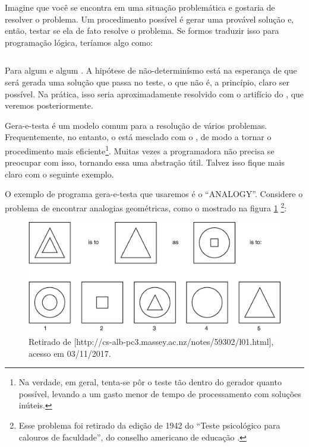 \documentclass{article}
\begin{document}
  Imagine que você se encontra em uma situação problemática e gostaria de resolver o problema. Um procedimento possível é gerar uma provável solução e, então, testar se ela de fato resolve o problema. Se formos traduzir isso para programação lógica, teríamos algo como:

%
\inputminted{prolog}{../Exemplos/Cap1/prog2_encontra.pl}

Para algum  e algum . A hipótese de não-determinísmo está na esperança de que será gerada uma solução que passa no teste, o que não é, a princípio, claro ser possível. Na prática, isso seria aproximadamente resolvido com o artifício do , que veremos posteriormente.

Gera-e-testa é um modelo comum para a resolução de vários problemas. Frequentemente, no entanto, o  está mesclado com o , de modo a tornar o procedimento mais eficiente\footnote{Na verdade, em geral, tenta-se pôr o teste tão dentro do gerador quanto possível, levando a um gasto menor de tempo de processamento com soluções inúteis.}. Muitas vezes a programadora não precisa se preocupar com isso, tornando essa uma abstração útil. Talvez isso fique mais claro com o seguinte exemplo.

O exemplo de programa gera-e-testa que usaremos é o ``ANALOGY''. Considere o problema de encontrar analogias geométricas, como o mostrado na figura \ref{fig:psi} \footnote{Esse problema foi retirado da edição de 1942 do ``Teste psicológico para calouros de faculdade'', do conselho americano de educação \cite{evans}.}:

\begin{figure}[h]
  \caption{Retirado de [http://cs-alb-pc3.massey.ac.nz/notes/59302/l01.html], acesso em 03/11/2017.}\label{fig:psi}
  \centering
  \includegraphics[width=\linewidth]{analogy}
\end{figure}
\end{document}

